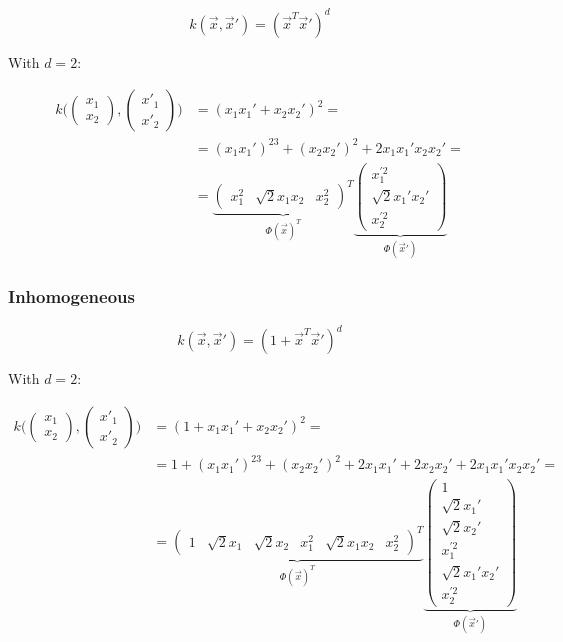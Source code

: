 		$$k(\vec{x},\vec{x}') = (\vec{x}^T\vec{x}')^d$$

		With $d=2$:

		\begin{align*}
			k\biggl(\begin{pmatrix}x_1\\x_2\end{pmatrix},\begin{pmatrix}x'_1\\x'_2\end{pmatrix}\biggr) &=(x_1x_1'+x_2x_2')^2 =\\
																																																 &=(x_1x_1')^23+(x_2x_2')^2+2x_1x_1'x_2x_2'=\\
																																																 &=\underbrace{\begin{pmatrix}x_1^2 &\sqrt{2}x_1x_2&x_2^2\end{pmatrix}^T}_{\Phi(\vec{x})^T}\underbrace{\begin{pmatrix}x_1^{'2}\\\sqrt{2}x_1'x_2'\\x_2^{'2}\end{pmatrix}}_{\Phi(\vec{x}')}
		\end{align*}

		\subsubsection{Inhomogeneous}

		$$k(\vec{x},\vec{x}') = (1+\vec{x}^T\vec{x}')^d$$

		With $d = 2$:

		\begin{align*}
			k\biggl(\begin{pmatrix}x_1\\x_2\end{pmatrix},\begin{pmatrix}x'_1\\x'_2\end{pmatrix}\biggr) &=(1+x_1x_1'+x_2x_2')^2 =\\
																																																 &=1+ (x_1x_1')^23+(x_2x_2')^2+2x_1x_1' +2x_2x_2'+2x_1x_1'x_2x_2'=\\
																																																 &=\underbrace{\begin{pmatrix}1&\sqrt{2}x_1 &\sqrt{2}x_2 &x_1^2 &\sqrt{2}x_1x_2 &x_2^2\end{pmatrix}^T}_{\Phi(\vec{x})^T}\underbrace{\begin{pmatrix}1\\\sqrt{2}x_1'\\\sqrt{2}x_2'\\x_1^{'2}\\\sqrt{2}x_1'x_2'\\x_2^{'2}\end{pmatrix}}_{\Phi(\vec{x}')}
		\end{align*}



